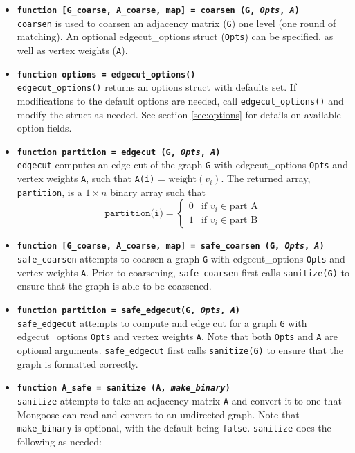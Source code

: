 \documentclass[letter]{article}
\begin{document}
\begin{itemize}
\item \textbf{\texttt{function [G\_coarse, A\_coarse, map] = coarsen (G, \textit{Opts}, \textit{A})}}\\
\texttt{coarsen} is used to coarsen an adjacency matrix (\texttt{G}) one level (one round of matching). An optional edgecut\_options struct (\texttt{Opts}) can be specified, as well as vertex weights (\texttt{A}).
\\
\item \textbf{\texttt{function options = edgecut\_options()}}\\
\texttt{edgecut\_options()} returns an options struct with defaults set. If modifications to the default options are needed, call \texttt{edgecut\_options()} and modify the struct as needed. See section \ref{sec:options} for details on available option fields.
\\
\item \textbf{\texttt{function partition = edgecut (G, \textit{Opts}, \textit{A})}}\\
\texttt{edgecut} computes an edge cut of the graph \texttt{G} with edgecut\_options \texttt{Opts} and vertex weights \texttt{A}, such that \texttt{A(i)} = $\text{weight}(v_i)$. The returned array, \texttt{partition}, is a $1 \times n$ binary array such that
\[
\texttt{partition(i)} = 
  \begin{cases} 
   0 & \text{if } v_i \in \text{part A} \\
   1 & \text{if } v_i \in \text{part B}
  \end{cases}
\]
\item \textbf{\texttt{function [G\_coarse, A\_coarse, map] = safe\_coarsen (G, \textit{Opts}, \textit{A})}}\\
\texttt{safe\_coarsen} attempts to coarsen a graph \texttt{G} with edgecut\_options \texttt{Opts} and vertex weights \texttt{A}. Prior to coarsening, \texttt{safe\_coarsen} first calls \texttt{sanitize(G)} to ensure that the graph is able to be coarsened.
\\
\item \textbf{\texttt{function partition = safe\_edgecut(G, \textit{Opts}, \textit{A})}}\\
\texttt{safe\_edgecut} attempts to compute and edge cut for a graph \texttt{G} with edgecut\_options \texttt{Opts} and vertex weights \texttt{A}. Note that both \texttt{Opts} and \texttt{A} are optional arguments. \texttt{safe\_edgecut} first calls \texttt{sanitize(G)} to ensure that the graph is formatted correctly.
\\ 
\item \textbf{\texttt{function A\_safe = sanitize (A, \textit{make\_binary})}}\\
\texttt{sanitize} attempts to take an adjacency matrix \texttt{A} and convert it to one that Mongoose can read and convert to an undirected graph. Note that \texttt{make\_binary} is optional, with the default being \texttt{false}. \texttt{sanitize} does the following as needed:


\end{itemize}
\end{document}
